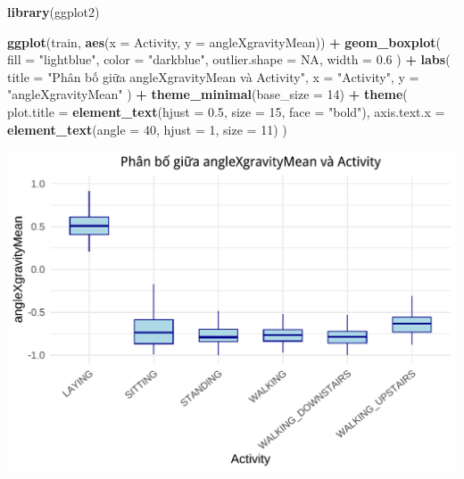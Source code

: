 \documentclass[
]{article}
\newenvironment{Shaded}{\begin{snugshade}}{\end{snugshade}}
\newcommand{\AttributeTok}[1]{\textcolor[rgb]{0.13,0.29,0.53}{#1}}
\newcommand{\ConstantTok}[1]{\textcolor[rgb]{0.56,0.35,0.01}{#1}}
\newcommand{\DecValTok}[1]{\textcolor[rgb]{0.00,0.00,0.81}{#1}}
\newcommand{\FloatTok}[1]{\textcolor[rgb]{0.00,0.00,0.81}{#1}}
\newcommand{\FunctionTok}[1]{\textcolor[rgb]{0.13,0.29,0.53}{\textbf{#1}}}
\newcommand{\NormalTok}[1]{#1}
\newcommand{\SpecialCharTok}[1]{\textcolor[rgb]{0.81,0.36,0.00}{\textbf{#1}}}
\newcommand{\StringTok}[1]{\textcolor[rgb]{0.31,0.60,0.02}{#1}}
\begin{document}
\begin{Shaded}
\begin{Highlighting}[]
\FunctionTok{library}\NormalTok{(ggplot2)}

\FunctionTok{ggplot}\NormalTok{(train, }\FunctionTok{aes}\NormalTok{(}\AttributeTok{x =}\NormalTok{ Activity, }\AttributeTok{y =}\NormalTok{ angleXgravityMean)) }\SpecialCharTok{+}
  \FunctionTok{geom\_boxplot}\NormalTok{(}
    \AttributeTok{fill =} \StringTok{"lightblue"}\NormalTok{,}
    \AttributeTok{color =} \StringTok{"darkblue"}\NormalTok{,}
    \AttributeTok{outlier.shape =} \ConstantTok{NA}\NormalTok{,}
    \AttributeTok{width =} \FloatTok{0.6}
\NormalTok{  ) }\SpecialCharTok{+}
  \FunctionTok{labs}\NormalTok{(}
    \AttributeTok{title =} \StringTok{"Phân bố giữa angleXgravityMean và Activity"}\NormalTok{,}
    \AttributeTok{x =} \StringTok{"Activity"}\NormalTok{,}
    \AttributeTok{y =} \StringTok{"angleXgravityMean"}
\NormalTok{  ) }\SpecialCharTok{+}
  \FunctionTok{theme\_minimal}\NormalTok{(}\AttributeTok{base\_size =} \DecValTok{14}\NormalTok{) }\SpecialCharTok{+}
  \FunctionTok{theme}\NormalTok{(}
    \AttributeTok{plot.title =} \FunctionTok{element\_text}\NormalTok{(}\AttributeTok{hjust =} \FloatTok{0.5}\NormalTok{, }\AttributeTok{size =} \DecValTok{15}\NormalTok{, }\AttributeTok{face =} \StringTok{"bold"}\NormalTok{),}
    \AttributeTok{axis.text.x =} \FunctionTok{element\_text}\NormalTok{(}\AttributeTok{angle =} \DecValTok{40}\NormalTok{, }\AttributeTok{hjust =} \DecValTok{1}\NormalTok{, }\AttributeTok{size =} \DecValTok{11}\NormalTok{)}
\NormalTok{  )}
\end{Highlighting}
\end{Shaded}

\includegraphics{report_files/figure-latex/unnamed-chunk-17-1.pdf}
\end{document}
